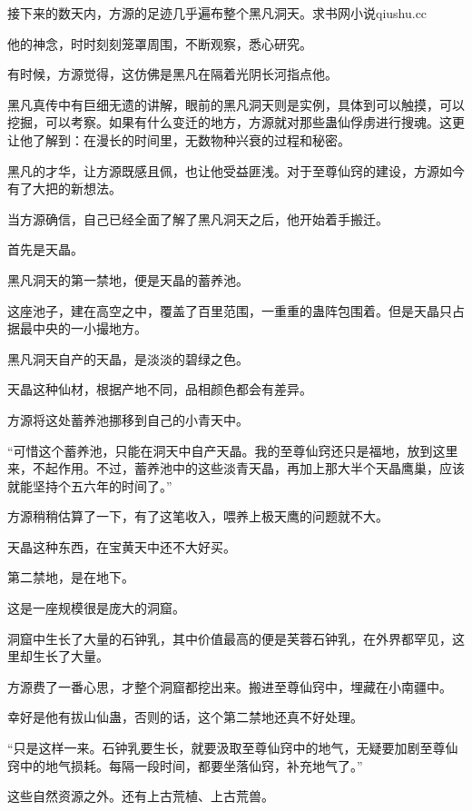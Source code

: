 
\begin{this_body}

接下来的数天内，方源的足迹几乎遍布整个黑凡洞天。求书网小说qiushu.cc

他的神念，时时刻刻笼罩周围，不断观察，悉心研究。

有时候，方源觉得，这仿佛是黑凡在隔着光阴长河指点他。

黑凡真传中有巨细无遗的讲解，眼前的黑凡洞天则是实例，具体到可以触摸，可以挖掘，可以考察。如果有什么变迁的地方，方源就对那些蛊仙俘虏进行搜魂。这更让他了解到：在漫长的时间里，无数物种兴衰的过程和秘密。

黑凡的才华，让方源既感且佩，也让他受益匪浅。对于至尊仙窍的建设，方源如今有了大把的新想法。

当方源确信，自己已经全面了解了黑凡洞天之后，他开始着手搬迁。

首先是天晶。

黑凡洞天的第一禁地，便是天晶的蓄养池。

这座池子，建在高空之中，覆盖了百里范围，一重重的蛊阵包围着。但是天晶只占据最中央的一小撮地方。

黑凡洞天自产的天晶，是淡淡的碧绿之色。

天晶这种仙材，根据产地不同，品相颜色都会有差异。

方源将这处蓄养池挪移到自己的小青天中。

“可惜这个蓄养池，只能在洞天中自产天晶。我的至尊仙窍还只是福地，放到这里来，不起作用。不过，蓄养池中的这些淡青天晶，再加上那大半个天晶鹰巢，应该就能坚持个五六年的时间了。”

方源稍稍估算了一下，有了这笔收入，喂养上极天鹰的问题就不大。

天晶这种东西，在宝黄天中还不大好买。

第二禁地，是在地下。

这是一座规模很是庞大的洞窟。

洞窟中生长了大量的石钟乳，其中价值最高的便是芙蓉石钟乳，在外界都罕见，这里却生长了大量。

方源费了一番心思，才整个洞窟都挖出来。搬进至尊仙窍中，埋藏在小南疆中。

幸好是他有拔山仙蛊，否则的话，这个第二禁地还真不好处理。

“只是这样一来。石钟乳要生长，就要汲取至尊仙窍中的地气，无疑要加剧至尊仙窍中的地气损耗。每隔一段时间，都要坐落仙窍，补充地气了。”

这些自然资源之外。还有上古荒植、上古荒兽。


\end{this_body}
